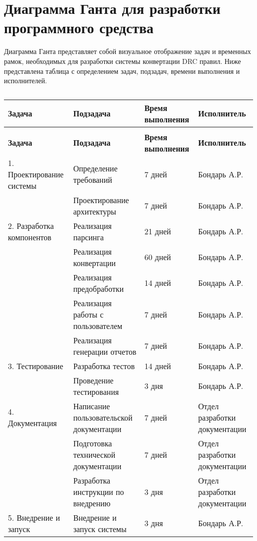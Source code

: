 \section{Диаграмма Ганта для разработки программного средства}

Диаграмма Ганта представляет собой визуальное отображение задач
и временных рамок, необходимых для разработки системы конвертации DRC правил.
Ниже представлена таблица
с определением задач, подзадач, времени выполнения и исполнителей.

\begin{longtable}{|p{3.5cm}|p{4cm}|p{3cm}|p{4cm}|}
	\caption{} \label{table:ganta} \\
	\hline
	\textbf{Задача}
	& \textbf{Подзадача}
	& \textbf{Время выполнения}
	& \textbf{Исполнитель} \\
	\hline
	\endfirsthead
	\conttable{table:ganta} \\
	\hline
	\textbf{Задача}
	& \textbf{Подзадача}
	& \textbf{Время выполнения}
	& \textbf{Исполнитель} \\
	\hline
	\endhead
	1. Проектирование системы
	& Определение требований
	& 7 дней
	& Бондарь А.Р. \\ \hline

	& Проектирование архитектуры
	& 7 дней
	& Бондарь А.Р. \\ \hline

	2. Разработка компонентов
	& Реализация парсинга
	& 21 дней
	& Бондарь А.Р. \\ \hline

	& Реализация конвертации
	& 60 дней
	& Бондарь А.Р. \\ \hline

	& Реализация предобработки
	& 14 дней
	& Бондарь А.Р. \\ \hline

	& Реализация работы с пользователем
	& 7 дней
	& Бондарь А.Р. \\ \hline

	& Реализация генерации отчетов
	& 7 дней
	& Бондарь А.Р. \\ \hline

	3. Тестирование
	& Разработка тестов
	& 14 дней
	& Бондарь А.Р. \\ \hline

	& Проведение тестирования
	& 3 дня
	& Бондарь А.Р. \\ \hline

	4. Документация
	& Написание пользовательской документации
	& 7 дней
	& Отдел разработки документации \\ \hline

	& Подготовка технической документации
	& 7 дней
	& Отдел разработки документации \\ \hline

	& Разработка инструкции по внедрению
	& 3 дня
	& Отдел разработки документации \\ \hline

	5. Внедрение и запуск
	& Внедрение и запуск системы
	& 3 дня
	& Бондарь А.Р. \\ \hline
\end{longtable}


